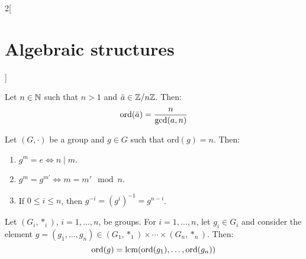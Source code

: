\documentclass[../../../main.tex]{subfiles}
\begin{document}
\begin{multicols}{2}[\section{Algebraic structures}]
\begin{corollary}
        Let $n\in\mathbb{N} $ such that $n>1$ and $\Bar{a}\in\mathbb{Z} /n\mathbb{Z} $. Then: $$\text{ord}(\Bar{a})=\frac{n}{\gcd(a,n)}$$
    \end{corollary}
    \begin{lemma}
        Let $(G,\cdot)$ be a group and $g\in G$ such that $\text{ord}(g)=n$. Then:
        \begin{enumerate}
            \item $g^m=e\iff n\mid m$.
            \item $g^m=g^{m'}\iff m=m'\mod{n}$.
            \item If $0\leq i\leq n$, then $g^{-i}=(g^i)^{-1}=g^{n-i}$.
        \end{enumerate}
    \end{lemma}
    \begin{corollary}
        Let $(G_i,*_i)$, $i=1,\ldots, n$, be groups. For $i=1,\ldots,n$, let $g_i\in G_i$ and consider the element $g=(g_1,\ldots,g_n)\in(G_1,*_1)\times\cdots\times(G_n,*_n)$. Then: $$\text{ord}(g)=\operatorname{lcm}(\text{ord}(g_1),\ldots,\text{ord}(g_n))$$
    \end{corollary}

\end{multicols}
\end{document}
